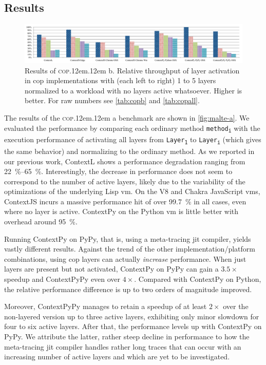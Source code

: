 \documentclass[preprint,english,10pt,nonatbib]{sigplanconf}
\DeclareRobustCommand*\copa{\textsc{cop}\kern .12em\oldstylenums{09}\kern .12em a\xspace}
\DeclareRobustCommand*\copb{\textsc{cop}\kern .12em\oldstylenums{09}\kern .12em b\xspace}
\begin{document}

\subsection{Results}

\begin{figure}
  \centering
  \includegraphics[width=.85\linewidth]{bench/malte-b}
  \caption{Results of \copb. Relative throughput of layer activation in
    \protect\acs{cop} implementations with (each left to right) 1 to 5 layers
    normalized to a workload with no layers active whatsoever. Higher is
    better. For raw numbers see \autoref{tab:copb} and \autoref{tab:copall}.}
  \label{fig:malte-b}
\end{figure}

The results of the \copa benchmark are shown in \autoref{fig:malte-a}. We
evaluated the performance by comparing each ordinary method
\texttt{method\textsubscript{i}} with the execution performance of activating
all layers from \texttt{Layer\textsubscript{1}} to
\texttt{Layer\textsubscript{i}} (which gives the same behavior) and normalizing
to the ordinary method. As we reported in our previous work, ContextL shows a
performance degradation ranging from \SIrange{22}{65}{\percent}. Interestingly,
the decrease in performance does not seem to correspond to the number of active
layers, likely due to the variability of the optimizations of the underlying
Lisp \ac{vm}. On the V8 and Chakra JavaScript \acp{vm}, ContextJS incurs a
massive performance hit of over \SI{99.7}{\percent} in all cases, even where no
layer is active. ContextPy on the Python \ac{vm} is little better with overhead
around \SI{95}{\percent}.

Running ContextPy on PyPy, that is, using a meta-tracing \ac{jit} compiler,
yields vastly different results. Against the trend of the other
implementation/platform combinations, using \ac{cop} layers can actually
\emph{increase} performance. When just layers are present but not activated,
ContextPy on PyPy can gain a \(3.5\times\) speedup and ContextPyPy even over
\(4\times\). Compared with ContextPy on Python, the relative performance
difference is up to two orders of magnitude improved.

Moreover, ContextPyPy manages to retain a speedup of at least \(2\times\)
over the non-layered version up to three active layers, exhibiting only minor
slowdown for four to six active layers. After that, the performance levels up
with ContextPy on PyPy. We attribute the latter, rather steep decline in
performance to how the meta-tracing \ac{jit} compiler handles rather long
traces that can occur with an increasing number of active layers and which are
yet to be investigated.
\end{document}

